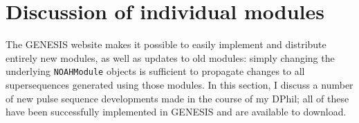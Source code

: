 \section{Discussion of individual modules}
\label{sec:noah__modules}

The GENESIS website makes it possible to easily implement and distribute entirely new modules, as well as updates to old modules: simply changing the underlying \texttt{NOAHModule} objects is sufficient to propagate changes to all supersequences generated using those modules.
In this section, I discuss a number of new pulse sequence developments made in the course of my DPhil; all of these have been successfully implemented in GENESIS and are available to download.









